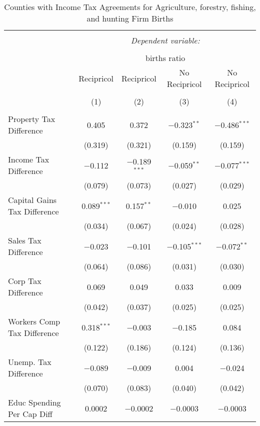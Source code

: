 
\begin{table}[!htbp] \centering 
  \caption{Counties with Income Tax Agreements for  Agriculture, forestry, fishing, and hunting Firm Births} 
  \label{11agreement} 
\begin{tabular}{@{\extracolsep{5pt}}lcccc} 
\\[-1.8ex]\hline 
\hline \\[-1.8ex] 
 & \multicolumn{4}{c}{\textit{Dependent variable:}} \\ 
\cline{2-5} 
\\[-1.8ex] & \multicolumn{4}{c}{births ratio} \\ 
 & Recipricol & Recipricol & No Recipricol & No Recipricol \\ 
\\[-1.8ex] & (1) & (2) & (3) & (4)\\ 
\hline \\[-1.8ex] 
 Property Tax Difference & 0.405 & 0.372 & $-$0.323$^{**}$ & $-$0.486$^{***}$ \\ 
  & (0.319) & (0.321) & (0.159) & (0.159) \\ 
  Income Tax Difference & $-$0.112 & $-$0.189$^{***}$ & $-$0.059$^{**}$ & $-$0.077$^{***}$ \\ 
  & (0.079) & (0.073) & (0.027) & (0.029) \\ 
  Capital Gains Tax Difference & 0.089$^{***}$ & 0.157$^{**}$ & $-$0.010 & 0.025 \\ 
  & (0.034) & (0.067) & (0.024) & (0.028) \\ 
  Sales Tax Difference & $-$0.023 & $-$0.101 & $-$0.105$^{***}$ & $-$0.072$^{**}$ \\ 
  & (0.064) & (0.086) & (0.031) & (0.030) \\ 
  Corp Tax Difference & 0.069 & 0.049 & 0.033 & 0.009 \\ 
  & (0.042) & (0.037) & (0.025) & (0.025) \\ 
  Workers Comp Tax Difference & 0.318$^{***}$ & $-$0.003 & $-$0.185 & 0.084 \\ 
  & (0.122) & (0.186) & (0.124) & (0.136) \\ 
  Unemp. Tax Difference & $-$0.089 & $-$0.009 & 0.004 & $-$0.024 \\ 
  & (0.070) & (0.083) & (0.040) & (0.042) \\ 
  Educ Spending Per Cap Diff & 0.0002 & $-$0.0002 & $-$0.0003 & $-$0.0003 \\ 

\end{tabular}
\end{table}
